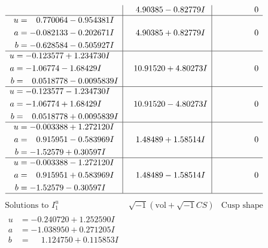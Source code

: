 \documentclass[1p]{elsarticle_modified}
\theoremstyle{definition}
\newcommand{\I}{\sqrt{-1}}
\begin{document}
$$\begin{array}{c|c|c}
 & \phantom{-}4.90385 - 0.82779 I & \phantom{-0.000000 } 0 \\ \hline\begin{aligned}
u &= \phantom{-}0.770064 - 0.954381 I \\
a &= -0.082133 - 0.202671 I \\
b &= -0.628584 - 0.505927 I\end{aligned}
 & \phantom{-}4.90385 + 0.82779 I & \phantom{-0.000000 } 0 \\ \hline\begin{aligned}
u &= -0.123577 + 1.234730 I \\
a &= -1.06774 - 1.68429 I \\
b &= \phantom{-}0.0518778 - 0.0095839 I\end{aligned}
 & \phantom{-}10.91520 + 4.80273 I & \phantom{-0.000000 } 0 \\ \hline\begin{aligned}
u &= -0.123577 - 1.234730 I \\
a &= -1.06774 + 1.68429 I \\
b &= \phantom{-}0.0518778 + 0.0095839 I\end{aligned}
 & \phantom{-}10.91520 - 4.80273 I & \phantom{-0.000000 } 0 \\ \hline\begin{aligned}
u &= -0.003388 + 1.272120 I \\
a &= \phantom{-}0.915951 - 0.583969 I \\
b &= -1.52579 + 0.30597 I\end{aligned}
 & \phantom{-}1.48489 + 1.58514 I & \phantom{-0.000000 } 0 \\ \hline\begin{aligned}
u &= -0.003388 - 1.272120 I \\
a &= \phantom{-}0.915951 + 0.583969 I \\
b &= -1.52579 - 0.30597 I\end{aligned}
 & \phantom{-}1.48489 - 1.58514 I & \phantom{-0.000000 } 0\\
 \hline 
 \end{array}$$\newpage$$\begin{array}{c|c|c}  
\text{Solutions to }I^u_{1}& \I (\text{vol} + \sqrt{-1}CS) & \text{Cusp shape}\\
 \hline 
\begin{aligned}
u &= -0.240720 + 1.252590 I \\
a &= -1.038950 + 0.271205 I \\
b &= \phantom{-}1.124750 + 0.115853 I\end{aligned}

\end{array}$$
\end{document}
